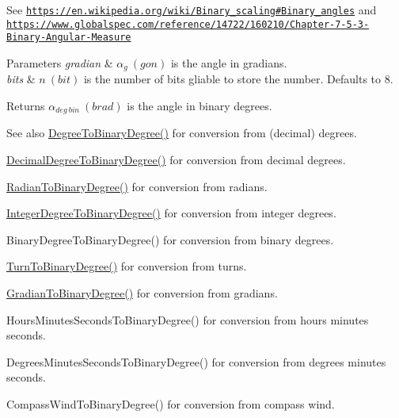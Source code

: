 See \href{https://en.wikipedia.org/wiki/Binary_scaling#Binary_angles}{\tt https\+://en.\+wikipedia.\+org/wiki/\+Binary\+\_\+scaling\#\+Binary\+\_\+angles} and \href{https://www.globalspec.com/reference/14722/160210/Chapter-7-5-3-Binary-Angular-Measure}{\tt https\+://www.\+globalspec.\+com/reference/14722/160210/\+Chapter-\/7-\/5-\/3-\/\+Binary-\/\+Angular-\/\+Measure} 
\begin{DoxyParams}{Parameters}
{\em gradian} & $\alpha_{g}\ (gon)$ is the angle in gradians. \\
\hline
{\em bits} & $n\ (bit)$ is the number of bits gliable to store the number. Defaults to 8. \\
\hline
\end{DoxyParams}
\begin{DoxyReturn}{Returns}
$\alpha_{deg\ bin}\ (brad)$ is the angle in binary degrees. 
\end{DoxyReturn}
\begin{DoxySeeAlso}{See also}
\mbox{\hyperlink{group___e_g_x_math-_angle_conversions-_degree_gacd1e3dc5194e89426a899a7cac4874f8}{Degree\+To\+Binary\+Degree()}} for conversion from (decimal) degrees. 

\mbox{\hyperlink{group___e_g_x_math-_angle_conversions-_decimal_degree_gaceec7ae7988c7f342d0b0fa6940720a1}{Decimal\+Degree\+To\+Binary\+Degree()}} for conversion from decimal degrees. 

\mbox{\hyperlink{group___e_g_x_math-_angle_conversions-_radian_ga13311d9b6977d514f1d6c336e7c0162b}{Radian\+To\+Binary\+Degree()}} for conversion from radians. 

\mbox{\hyperlink{group___e_g_x_math-_angle_conversions-_integer_degree_ga694bbfe624c3c14e97ce6155ca9bc44d}{Integer\+Degree\+To\+Binary\+Degree()}} for conversion from integer degrees. 

Binary\+Degree\+To\+Binary\+Degree() for conversion from binary degrees. 

\mbox{\hyperlink{group___e_g_x_math-_angle_conversions-_turn_ga678efb8f5c3958351fc3f1dfaf117b28}{Turn\+To\+Binary\+Degree()}} for conversion from turns. 

\mbox{\hyperlink{group___e_g_x_math-_angle_conversions-_gradian_ga6bf31920148bfd61f1f06eb961c3f62b}{Gradian\+To\+Binary\+Degree()}} for conversion from gradians. 

Hours\+Minutes\+Seconds\+To\+Binary\+Degree() for conversion from hours minutes seconds. 

Degrees\+Minutes\+Seconds\+To\+Binary\+Degree() for conversion from degrees minutes seconds. 

Compass\+Wind\+To\+Binary\+Degree() for conversion from compass wind. 
\end{DoxySeeAlso}
\mbox{\label{group___e_g_x_math-_angle_conversions-_gon_ga1d8ed4116236694608d7409aa149f677}} 
